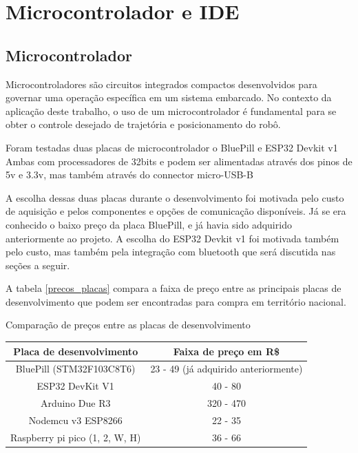 
\section{Microcontrolador e IDE}

\subsection{Microcontrolador}

Microcontroladores são circuitos integrados compactos desenvolvidos para governar
uma operação específica em um sistema embarcado. No contexto da aplicação deste
trabalho, o uso de um microcontrolador é fundamental para se obter o controle
desejado de trajetória e posicionamento do robô.

Foram testadas duas placas de microcontrolador o BluePill e ESP32 Devkit v1
Ambas com processadores de 32bits
e podem ser alimentadas através dos pinos de 5v e 3.3v, mas também através do connector micro-USB-B

A escolha dessas duas placas durante o desenvolvimento foi motivada pelo custo de aquisição
e pelos componentes e opções de comunicação disponíveis.
Já se era conhecido o baixo preço da placa BluePill, e já havia sido adquirido anteriormente ao projeto.
A escolha do ESP32 Devkit v1 foi motivada também pelo custo, mas também pela
integração com bluetooth que será discutida nas seções a seguir.

A tabela \ref{precos_placas} compara a faixa de preço entre as principais placas de desenvolvimento
que podem ser encontradas para compra em território nacional.

\begin{quadro}[htb]
	\caption{Comparação de preços entre as placas de desenvolvimento \label{precos_placas}}
	 \begin{tabular}{|c|c|}
		\hline
		\textbf{Placa de desenvolvimento} & \textbf{Faixa de preço em R\$} \\ \hline
		BluePill (STM32F103C8T6) &  23 - 49 (já adquirido anteriormente) \\ \hline
		ESP32 DevKit V1  &  40 - 80   \\ \hline
		Arduino Due R3 &  320 - 470   \\ \hline
		Nodemcu v3 ESP8266 & 22 - 35   \\ \hline
		Raspberry pi pico (1, 2, W, H)  & 36 - 66  \\ \hline
	\end{tabular}
\end{quadro}

